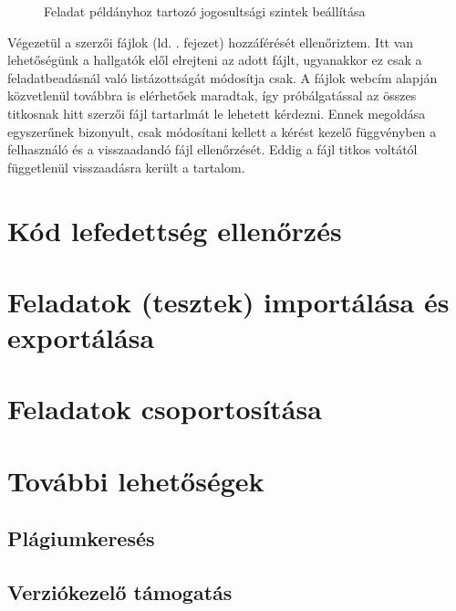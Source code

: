 \begin{figure}[h]
    \centering
    \caption{Feladat példányhoz tartozó jogosultsági szintek beállítása}
    \label{fig:exercise_perms}
\end{figure}

Végezetül a szerzői fájlok (ld. . fejezet) hozzáférését ellenőriztem. Itt van lehetőségünk a hallgatók elől elrejteni az adott fájlt, ugyanakkor ez csak a feladatbeadásnál való listázottságát módosítja csak. A fájlok webcím alapján közvetlenül továbbra is elérhetőek maradtak, így próbálgatással az összes titkosnak hitt szerzői fájl tartarlmát le lehetett kérdezni. Ennek megoldása egyszerűnek bizonyult, csak módosítani kellett a kérést kezelő függvényben a felhasználó és a visszaadandó fájl ellenőrzését. Eddig a fájl titkos voltától függetlenül visszaadásra került a tartalom.

\section{Kód lefedettség ellenőrzés}

\section{Feladatok (tesztek) importálása és exportálása}

\section{Feladatok csoportosítása}

\section{További lehetőségek}

\subsection{Plágiumkeresés}

\subsection{Verziókezelő támogatás}